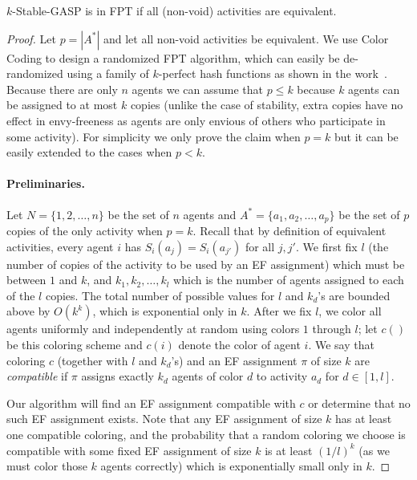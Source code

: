 \begin{theorem}
$k$-Stable-GASP is in FPT if all (non-void) activities are equivalent.
%
\end{theorem}
\begin{proof}
Let $p=|A^*|$ and let all non-void activities be equivalent.
We use Color Coding to design a randomized FPT algorithm, which can easily be de-randomized using a family of $k$-perfect hash functions as shown in the work~\cite{ColorCoding}. 
Because there are only $n$ agents we can assume that $p \leq k$ because $k$ agents can be assigned to at most $k$ copies (unlike the case of stability, extra copies have no effect in envy-freeness as agents are only envious of others who participate in some activity).
For simplicity we only prove the claim when $p = k$ but it can be easily extended to the cases when $p < k$. 

\paragraph{Preliminaries.}
Let $N = \{1, 2, \dots, n\}$ be the set of $n$ agents and $A^* = \{a_1, a_2, \dots, a_p\}$ be the set of $p$ copies of the only activity when $p = k$. Recall that by definition of equivalent activities, every agent $i$ has $S_i(a_j) = S_i(a_{j'})$ for all $j,j'$.
We first fix $l$ (the number of copies of the activity to be used by an EF assignment) which must be between $1$ and $k$, and $k_1, k_2, \dots, k_l$ which is the number of agents assigned to each of the $l$ copies.
The total number of possible values for $l$ and $k_d$'s are bounded above by $O(k^k)$, which is exponential only in $k$.
After we fix $l$, we color all agents uniformly and independently at random using colors $1$ through $l$; let $c()$ be this coloring scheme and $c(i)$ denote the color of agent $i$. 
We say that coloring $c$ (together with $l$ and $k_d$'s) and an EF assignment $\pi$ of size $k$ are {\em compatible} if $\pi$ assigns exactly $k_d$ agents of color $d$ to activity $a_d$ for $d\in [1, l]$.

Our algorithm will find an EF assignment compatible with $c$ or determine that no such EF assignment exists. 
Note that any EF assignment of size $k$ has at least one compatible coloring, and the probability that a random coloring we choose is compatible with some fixed EF assignment of size $k$ is at least $(1/l)^k$ (as we must color those $k$ agents correctly) which is exponentially small only in $k$. 


\end{proof}
